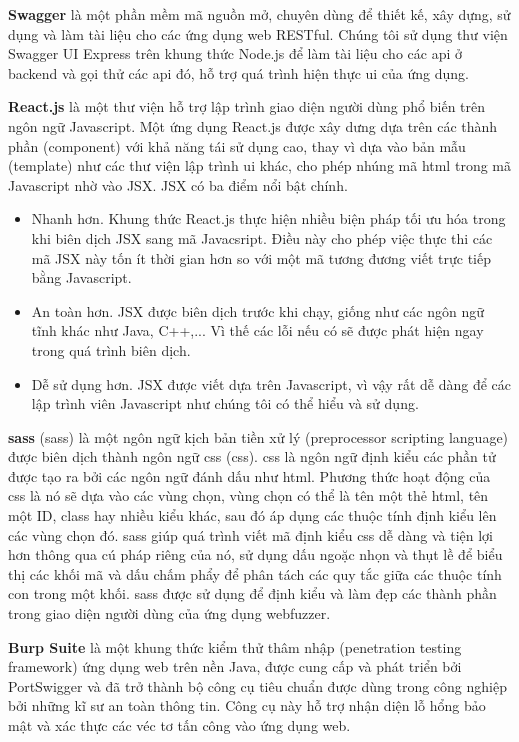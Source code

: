 \textbf{Swagger} là một phần mềm mã nguồn mở, chuyên dùng để thiết kế, xây dựng, sử dụng và làm tài liệu cho các ứng dụng web RESTful. Chúng tôi sử dụng thư viện Swagger UI Express \parencite{swagger-ui-express-npm} trên khung thức Node.js để làm tài liệu cho các \acrshort{api} ở backend và gọi thử các \acrshort{api} đó, hỗ trợ quá trình hiện thực \acrshort{ui} của ứng dụng.\par
\textbf{React.js} là một thư viện hỗ trợ lập trình giao diện người dùng phổ biến trên ngôn ngữ Javascript. Một ứng dụng React.js được xây dưng dựa trên các thành phần (component) với khả năng tái sử dụng cao, thay vì dựa vào bản mẫu (template) như các thư viện lập trình \acrshort{ui} khác, cho phép nhúng mã \acrshort{html} trong mã Javascript nhờ vào JSX. JSX có ba điểm nổi bật chính.
\begin{itemize}
    \item Nhanh hơn. Khung thức React.js thực hiện nhiều biện pháp tối ưu hóa trong khi biên dịch JSX sang mã Javacsript. Điều này cho phép việc thực thi các mã JSX này tốn ít thời gian hơn so với một mã tương đương viết trực tiếp bằng Javascript.
    \item An toàn hơn. JSX được biên dịch trước khi chạy, giống như các ngôn ngữ tĩnh khác như Java, C++,... Vì thế các lỗi nếu có sẽ được phát hiện ngay trong quá trình biên dịch.
    \item Dễ sử dụng hơn. JSX được viết dựa trên Javascript, vì vậy rất dễ dàng để các lập trình viên Javascript như chúng tôi có thể hiểu và sử dụng.
\end{itemize}
\textbf{\acrshort{sass}} (\acrlong{sass}) là một ngôn ngữ kịch bản tiền xử lý (preprocessor scripting language) được biên dịch thành ngôn ngữ \acrshort{css} (\acrlong{css}). \acrshort{css} là ngôn ngữ định kiểu các phần tử được tạo ra bởi các ngôn ngữ đánh dấu như \acrshort{html}. Phương thức hoạt động của \acrshort{css} là nó sẽ dựa vào các vùng chọn, vùng chọn có thể là tên một thẻ \acrshort{html}, tên một ID, class hay nhiều kiểu khác, sau đó áp dụng các thuộc tính định kiểu lên các vùng chọn đó. \acrshort{sass} giúp quá trình viết mã định kiểu \acrshort{css} dễ dàng và tiện lợi hơn thông qua cú pháp riêng của nó, sử dụng dấu ngoặc nhọn và thụt lề để biểu thị các khối mã và dấu chấm phẩy để phân tách các quy tắc giữa các thuộc tính con trong một khối. \acrshort{sass} được sử dụng để định kiểu và làm đẹp các thành phần trong giao diện người dùng của ứng dụng webfuzzer.\par
\textbf{Burp Suite} \parencite{burpsuite} là một khung thức kiểm thử thâm nhập (penetration testing framework) ứng dụng web trên nền Java, được cung cấp và phát triển bởi PortSwigger và đã trở thành bộ công cụ tiêu chuẩn được dùng trong công nghiệp bởi những kĩ sư an toàn thông tin. Công cụ này hỗ trợ nhận diện lỗ hổng bảo mật và xác thực các véc tơ tấn công vào ứng dụng web.
